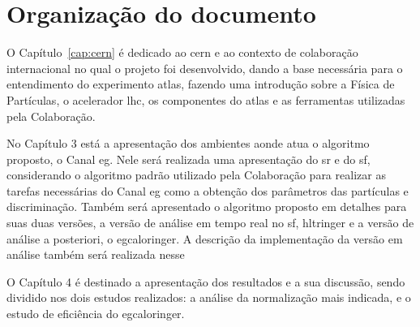 \section{Organização do documento} {{{

O Capítulo~\ref{cap:cern} é dedicado ao \gls{cern} e ao contexto de colaboração internacional
no qual o projeto foi desenvolvido, dando a base necessária para o entendimento
do experimento \gls{atlas}, fazendo uma introdução sobre a Física de Partículas,
o acelerador \gls{lhc}, os componentes do \gls{atlas} e as ferramentas
utilizadas pela Colaboração.

No Capítulo 3 está a apresentação dos ambientes aonde atua o algoritmo proposto,
o Canal \acrshort{eg}. Nele será realizada uma apresentação do \gls{sr} e do
\gls{sf}, considerando o algoritmo padrão utilizado pela Colaboração para
realizar as tarefas necessárias do Canal \gls{eg} como a obtenção dos parâmetros
das partículas e discriminação. Também será apresentado o algoritmo proposto em
detalhes para suas duas versões, a versão de análise em tempo real no \gls{sf},
\gls{hltringer} e a versão de análise a posteriori, o \gls{egcaloringer}. A
descrição da implementação da versão em análise também será realizada nesse 

O Capítulo 4 é destinado a apresentação dos resultados e a sua discussão,
sendo dividido nos dois estudos realizados: a análise da normalização mais
indicada, e o estudo de eficiência do \gls{egcaloringer}. 
}}}
